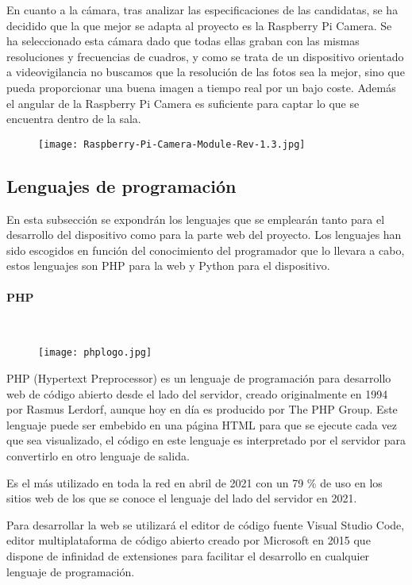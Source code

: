 En cuanto a la cámara, tras analizar las especificaciones de las candidatas, se ha decidido que la que mejor se adapta al proyecto es la Raspberry Pi Camera. Se ha seleccionado esta cámara dado que todas ellas graban con las mismas resoluciones y frecuencias de cuadros, y como se trata de un dispositivo orientado a videovigilancia no buscamos que la resolución de las fotos sea la mejor, sino que pueda proporcionar una buena imagen a tiempo real por un bajo coste. Además el angular de la Raspberry Pi Camera es suficiente para captar lo que se encuentra dentro de la sala.
\begin{figure}[H]
	{\texttt{[image: Raspberry-Pi-Camera-Module-Rev-1.3.jpg]}}
\end{figure}

\subsection{Lenguajes de programación}
En esta subsección se expondrán los lenguajes que se emplearán tanto para el desarrollo del dispositivo como para la parte web del proyecto. Los lenguajes han sido escogidos en función del conocimiento del programador que lo llevara a cabo, estos lenguajes son PHP para la web y Python para el dispositivo.

\paragraph{PHP}\mbox{} \\
\begin{figure}[H]
	{\texttt{[image: phplogo.jpg]}}
\end{figure}
PHP (Hypertext Preprocessor) \cite{welling_php_2003} es un lenguaje de programación para desarrollo web de código abierto desde el lado del servidor, creado originalmente en 1994 por Rasmus Lerdorf, aunque hoy en día es producido por The PHP Group. Este lenguaje puede ser embebido en una página HTML para que se ejecute cada vez que sea visualizado, el código en este lenguaje es interpretado por el servidor para convertirlo en otro lenguaje de salida.

Es el más utilizado en toda la red en abril de 2021 \cite{noauthor_usage_nodate} con un 79 \% de uso en los sitios web de los que se conoce el lenguaje del lado del servidor en 2021.

Para desarrollar la web se utilizará el editor de código fuente Visual Studio Code, editor multiplataforma de código abierto creado por Microsoft en 2015 \cite{noauthor_visual_2021} que dispone de infinidad de extensiones para facilitar el desarrollo en cualquier lenguaje de programación.

